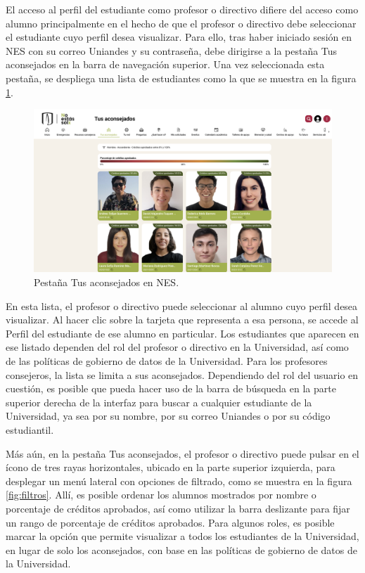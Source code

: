 El acceso al perfil del estudiante como profesor o directivo difiere del acceso como alumno principalmente en el hecho de que el profesor o directivo debe seleccionar el estudiante cuyo perfil desea visualizar. Para ello, tras haber iniciado sesión en \gls{NES} con su correo Uniandes y su contraseña, debe dirigirse a la pestaña Tus aconsejados en la barra de navegación superior. Una vez seleccionada esta pestaña, se despliega una lista de estudiantes como la que se muestra en la figura \ref{fig:tus_aconsejados}.

\begin{figure}[H]
	\includegraphics[width=\textwidth]{assets/nes/tus_aconsejados.png}
	\caption{Pestaña Tus aconsejados en NES.}
	\label{fig:tus_aconsejados}
\end{figure}

En esta lista, el profesor o directivo puede seleccionar al alumno cuyo perfil desea visualizar. Al hacer clic sobre la tarjeta que representa a esa persona, se accede al Perfil del estudiante de ese alumno en particular. Los estudiantes que aparecen en ese listado dependen del rol del profesor o directivo en la Universidad, así como de las políticas de gobierno de datos de la Universidad. Para los profesores consejeros, la lista se limita a sus aconsejados. Dependiendo del rol del usuario en cuestión, es posible que pueda hacer uso de la barra de búsqueda en la parte superior derecha de la interfaz para buscar a cualquier estudiante de la Universidad, ya sea por su nombre, por su correo Uniandes o por su código estudiantil.

Más aún, en la pestaña Tus aconsejados, el profesor o directivo puede pulsar en el ícono de tres rayas horizontales, ubicado en la parte superior izquierda, para desplegar un menú lateral con opciones de filtrado, como se muestra en la figura \ref{fig:filtros}. Allí, es posible ordenar los alumnos mostrados por nombre o porcentaje de créditos aprobados, así como utilizar la barra deslizante para fijar un rango de porcentaje de créditos aprobados. Para algunos roles, es posible marcar la opción que permite visualizar a todos los estudiantes de la Universidad, en lugar de solo los aconsejados, con base en las políticas de gobierno de datos de la Universidad.

